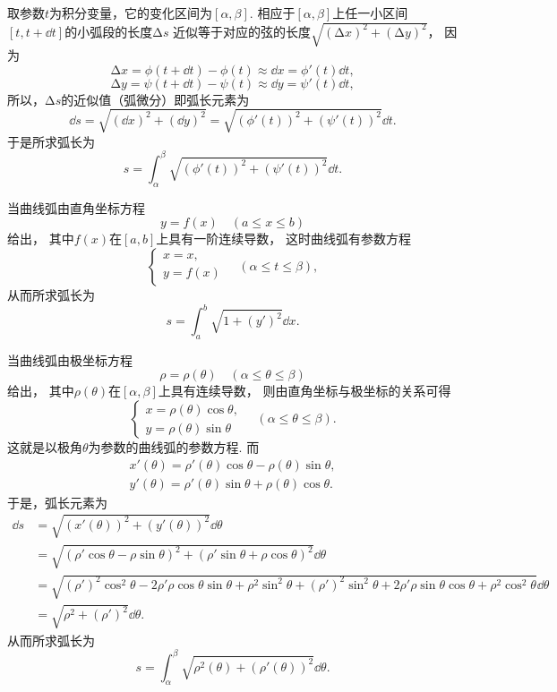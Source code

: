取参数\(t\)为积分变量，它的变化区间为\([\alpha,\beta]\).
相应于\([\alpha,\beta]\)上任一小区间\([t,t+\dd{t}]\)的小弧段的长度\(\increment s\)
近似等于对应的弦的长度\(\sqrt{(\increment x)^2+(\increment y)^2}\)，
因为\[
	\increment x
	= \phi(t+\dd{t})-\phi(t)
	\approx \dd{x}
	= \phi'(t) \dd{t},
\]\[
	\increment y
	= \psi(t+\dd{t})-\psi(t)
	\approx \dd{y}
	= \psi'(t) \dd{t},
\]
所以，\(\increment s\)的近似值（弧微分）即弧长元素为\[
	\dd{s} = \sqrt{(\dd{x})^2 + (\dd{y})^2}
	= \sqrt{(\phi'(t))^2 + (\psi'(t))^2} \dd{t}.
\]
于是所求弧长为\begin{equation}
	s = \int_\alpha^\beta \sqrt{(\phi'(t))^2 + (\psi'(t))^2} \dd{t}.
\end{equation}

当曲线弧由直角坐标方程\[
	y = f(x) \quad(a \leq x \leq b)
\]给出，
其中\(f(x)\)在\([a,b]\)上具有一阶连续导数，
这时曲线弧有参数方程\[
	\left\{ \begin{array}{l}
		x = x, \\
		y = f(x)
	\end{array} \right.
	\quad(\alpha \leq t \leq \beta),
\]
从而所求弧长为\begin{equation}
	s = \int_a^b \sqrt{1+(y')^2} \dd{x}.
\end{equation}

当曲线弧由极坐标方程\[
	\rho=\rho(\theta)
	\quad(\alpha \leq \theta \leq \beta)
\]给出，
其中\(\rho(\theta)\)在\([\alpha,\beta]\)上具有连续导数，
则由直角坐标与极坐标的关系可得\[
	\left\{ \begin{array}{c}
		x = \rho(\theta) \cos\theta, \\
		y = \rho(\theta) \sin\theta
	\end{array} \right.
	\quad(\alpha \leq \theta \leq \beta).
\]
这就是以极角\(\theta\)为参数的曲线弧的参数方程.
而\begin{gather*}
	x'(\theta) = \rho'(\theta) \cos\theta - \rho(\theta) \sin\theta, \\
	y'(\theta) = \rho'(\theta) \sin\theta + \rho(\theta) \cos\theta.
\end{gather*}
于是，弧长元素为\begin{align*}
	\dd{s}
	&= \sqrt{(x'(\theta))^2 + (y'(\theta))^2} \dd{\theta} \\
	&= \sqrt{(\rho' \cos\theta - \rho \sin\theta)^2
		+ (\rho' \sin\theta + \rho \cos\theta)^2} \dd{\theta} \\
	&= \sqrt{(\rho')^2\cos^2\theta-2\rho'\rho\cos\theta\sin\theta+\rho^2\sin^2\theta
		+ (\rho')^2\sin^2\theta+2\rho'\rho\sin\theta\cos\theta+\rho^2\cos^2\theta} \dd{\theta} \\
	&= \sqrt{\rho^2 + (\rho')^2} \dd{\theta}.
\end{align*}
从而所求弧长为\begin{equation}
	s = \int_\alpha^\beta \sqrt{\rho^2(\theta) + (\rho'(\theta))^2} \dd{\theta}.
\end{equation}

